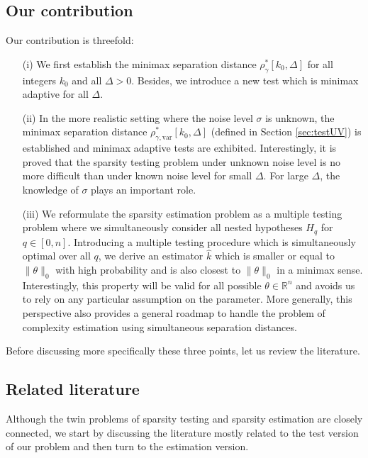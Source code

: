 \documentclass[twoside,11pt]{article}
\newcommand{\<}{\langle}
\renewcommand{\>}{\rangle}
\begin{document}
\subsection{Our contribution}\label{sec:contrib}


Our contribution is threefold:
\begin{enumerate}
\item[(i)] We first establish the minimax separation distance $\rho_{\gamma}^*[k_0,\Delta]$ for all integers $k_0$ and all $\Delta>0$. Besides, we introduce a new test which is minimax adaptive for all $\Delta$.  
\item[(ii)] In the more realistic setting where the noise level $\sigma$ is unknown, the minimax separation distance  $\rho_{\gamma,\mathrm{var}}^*[k_0,\Delta]$ (defined in Section \ref{sec:testUV}) is established and minimax adaptive tests are exhibited. Interestingly, it is proved that the sparsity testing problem under unknown noise level is no more difficult than under known noise level for small $\Delta$. For large $\Delta$, the knowledge of $\sigma$ plays an important role.
\item[(iii)] We reformulate the sparsity estimation problem as a multiple testing problem where we simultaneously consider all nested hypotheses $H_{q}$ for $q\in [0,n]$. Introducing a multiple testing procedure which is simultaneously optimal over all $q$, we derive an estimator $\widehat{k}$ which is smaller or equal to $\|\theta\|_0$ with high probability and is also closest to $\|\theta\|_0$ in a minimax sense. Interestingly, this property will be valid for all possible $\theta\in \mathbb{R}^n$ and avoids us to rely on any particular assumption on the parameter. 
More generally, this perspective also provides a general roadmap to handle the problem of complexity estimation using simultaneous separation distances. 
\end{enumerate}

Before discussing more specifically these three points, let us review the literature. 

\subsection{Related literature}


Although the twin problems of sparsity testing and sparsity estimation are closely connected, we start by discussing the literature mostly related to the test version of our problem and then turn to the estimation version. 
\end{document}
